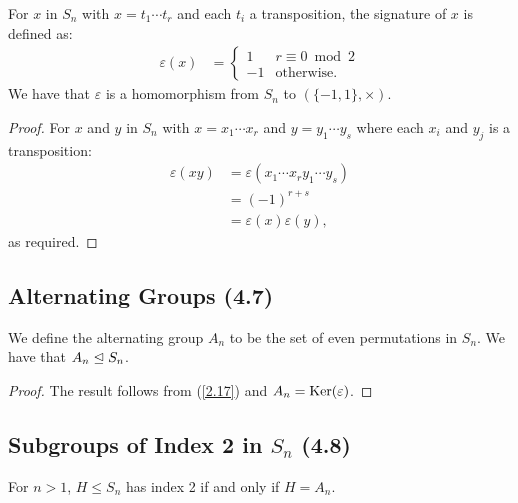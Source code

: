 For $x$ in $S_n$ with $x = t_1 \cdots t_r$ and each $t_i$ a transposition,
the signature of $x$ is defined as: \begin{align*}
    \varepsilon(x) &= \begin{cases}
        1 & r \equiv 0 \bmod 2 \\
        -1 & \text{otherwise}.
    \end{cases}
\end{align*} We have that $\varepsilon$ is a homomorphism from $S_n$ to $(\{-1, 1\}, \times)$.

\begin{proof}
    For $x$ and $y$ in $S_n$ with $x = x_1 \cdots x_r$ and $y = y_1 \cdots y_s$
    where each $x_i$ and $y_j$ is a transposition: \begin{align*}
        \varepsilon(xy) 
        &= \varepsilon(x_1 \cdots x_ry_1 \cdots y_s) \\
        &= (-1)^{r + s} \\
        &= \varepsilon(x)\varepsilon(y),
    \end{align*} as required.
\end{proof} 

\subsection{Alternating Groups (4.7)} \label{4.7}

We define the alternating group $A_n$ to be the set of even permutations
in $S_n$. We have that $A_n \trianglelefteq S_n$.

\begin{proof}
    The result follows from (\ref{2.17}) and $A_n = \operatorname{Ker}(\varepsilon)$.
\end{proof}

\subsection{Subgroups of Index 2 in $S_n$ (4.8)} \label{4.8}

For $n > 1$, $H \leq S_n$ has index 2 if and only if $H = A_n$.

